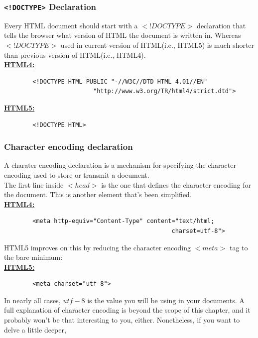 \documentclass[11pt,a4paper]{article}
\begin{document}
\subsubsection*{\texttt{<!DOCTYPE>} Declaration}
Every HTML document should start with a $<!DOCTYPE>$ declaration that tells the browser what version of HTML the document is written in. Whereas $<!DOCTYPE>$ used in current version of HTML(i.e., HTML5) is much shorter than previous version of HTML(i.e., HTML4).\\

\textbf{\underline{\small{HTML4:}}}
\begin{verbatim}
        <!DOCTYPE HTML PUBLIC "-//W3C//DTD HTML 4.01//EN" 
                         "http://www.w3.org/TR/html4/strict.dtd">
\end{verbatim}

\textbf{\underline{\small{HTML5:}}}
\begin{verbatim}
        <!DOCTYPE HTML>
\end{verbatim}

\subsubsection*{Character encoding declaration}
A charater encoding declaration is a mechanism for specifying the character encoding used to store or transmit a document.\\
The first line inside $<head>$ is the one that defines the character encoding for the document. This is another element that's been simplified.\\

\textbf{\small{\underline{HTML4:}}}
\begin{verbatim}
        <meta http-equiv="Content-Type" content="text/html; 
                                               charset=utf-8">
\end{verbatim}
HTML5 improves on this by reducing the character encoding $<meta>$ tag to the bare minimum:\\

\textbf{\small{\underline{HTML5:}}}
\begin{verbatim}
        <meta charset="utf-8">
\end{verbatim}
In nearly all cases, $utf-8$ is the value you will be using in your documents. A full explanation of character encoding is beyond the scope of this chapter, and it probably won’t be that interesting to you, either. Nonetheless, if you want to delve a little deeper,
\end{document}
